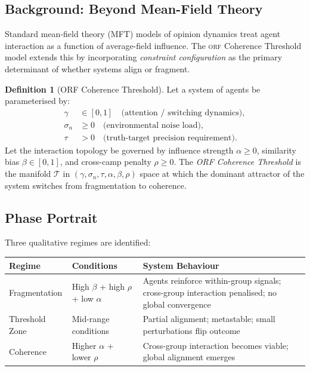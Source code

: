 \documentclass[12pt,a4paper]{article}
\theoremstyle{definition}
\newtheorem{definition}{Definition}[section]
\newcommand{\orf}{\textsc{orf}}
\begin{document}
\subsection{Background: Beyond Mean-Field Theory}

Standard mean-field theory (MFT) models of opinion dynamics treat agent
interaction as a function of average-field influence.  The \orf{} Coherence
Threshold model extends this by incorporating \emph{constraint configuration}
as the primary determinant of whether systems align or fragment.

\begin{definition}[ORF Coherence Threshold]
  Let a system of agents be parameterised by:
  \begin{align}
    \gamma &\in [0,1] \quad \text{(attention / switching dynamics)}, \\
    \sigma_n &\geq 0 \quad \text{(environmental noise load)}, \\
    \tau &> 0 \quad \text{(truth-target precision requirement)}.
  \end{align}
  Let the interaction topology be governed by influence strength
  $\alpha \geq 0$, similarity bias $\beta \in [0,1]$, and cross-camp
  penalty $\rho \geq 0$.  The \emph{ORF Coherence Threshold} is the
  manifold $\mathcal{T}$ in $(\gamma, \sigma_n, \tau, \alpha, \beta, \rho)$
  space at which the dominant attractor of the system switches from
  fragmentation to coherence.
\end{definition}

\subsection{Phase Portrait}

Three qualitative regimes are identified:

\begin{longtable}{@{}p{3cm}p{5cm}p{5cm}@{}}
  \toprule
  \textbf{Regime} & \textbf{Conditions} & \textbf{System Behaviour} \\
  \midrule
  Fragmentation & High $\beta$ + high $\rho$ + low $\alpha$ &
    Agents reinforce within-group signals; cross-group interaction
    penalised; no global convergence \\
  Threshold Zone & Mid-range conditions & Partial alignment; metastable;
    small perturbations flip outcome \\
  Coherence & Higher $\alpha$ + lower $\rho$ &
    Cross-group interaction becomes viable; global alignment emerges \\
  \bottomrule
\end{longtable}
\end{document}
